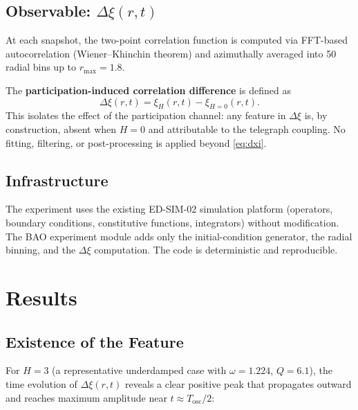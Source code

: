 \documentclass[11pt]{article}
\begin{document}
\subsection{Observable: \texorpdfstring{\(\Delta\xi(r, t)\)}{Delta-xi(r,t)}}

At each snapshot, the two-point correlation function is computed via FFT-based autocorrelation (Wiener--Khinchin theorem) and azimuthally averaged into 50 radial bins up to \(r_{\max} = 1.8\).

The \textbf{participation-induced correlation difference} is defined as
\begin{equation}\label{eq:dxi}
  \Delta\xi(r, t) = \xi_H(r, t) - \xi_{H=0}(r, t).
\end{equation}
This isolates the effect of the participation channel: any feature in \(\Delta\xi\) is, by construction, absent when \(H = 0\) and attributable to the telegraph coupling. No fitting, filtering, or post-processing is applied beyond \eqref{eq:dxi}.

\subsection{Infrastructure}

The experiment uses the existing ED-SIM-02 simulation platform (operators, boundary conditions, constitutive functions, integrators) without modification. The BAO experiment module adds only the initial-condition generator, the radial binning, and the \(\Delta\xi\) computation. The code is deterministic and reproducible.

\section{Results}

\subsection{Existence of the Feature}

For \(H = 3\) (a representative underdamped case with \(\omega = 1.224\), \(Q = 6.1\)), the time evolution of \(\Delta\xi(r, t)\) reveals a clear positive peak that propagates outward and reaches maximum amplitude near \(t \approx T_{\mathrm{osc}}/2\):
\end{document}
